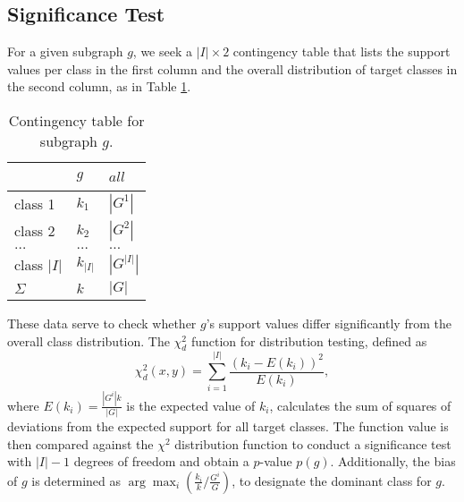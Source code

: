 \documentclass{sig-alternate}
\begin{document}
\subsection{Significance Test}
\label{ss:significance-test}
For a given subgraph $g$, we seek a $|I| \times 2$ contingency table that lists the
support values per class in the first column and the overall distribution of target
classes in the second column, as in Table \ref{t-ContingencyTableIndTest}.
\begin{table}[t]
  \centering
  \begin{tabular}{|l|l|l|}
    \hline
    ~           &	$g$       & $all$       \\\hline
    class 1	    &	$k_1$     & $|G^1|$     \\\hline
    class 2 	  &	$k_2$     & $|G^2|$     \\\hline
    $\ldots$ 	  &	$\ldots$  & $\ldots$    \\\hline
    class $|I|$	&	$k_{|I|}$ & $|G^{|I|}|$ \\\hline
    $\Sigma$	  &	$k$       & $|G|$       \\\hline
  \end{tabular}
  \caption[]{Contingency table for subgraph $g$.}
  \label{t-ContingencyTableIndTest}
\end{table}
These data serve to check whether $g$'s support values differ
significantly from the overall class distribution. The $\chi^2_d$ function for
distribution testing, defined as
\begin{equation}
  \chi^2_d(x,y) = \sum_{i=1}^{|I|} \frac{(k_i-E(k_i))^2}{E(k_i)},
  \label{eq:chid}
\end{equation} 
where $E(k_i)=\frac{|G^{i}| k}{|G|}$ is the expected value of $k_i$, calculates
the sum of squares of deviations from the expected support for all target
classes. The function value is then compared against the $\chi^2$
distribution function to conduct a significance test with
$|I|-1$ degrees of freedom and obtain a $p$-value $p(g)$. 
Additionally, the bias of $g$ is determined as $\arg\max_i (\frac{k_i}{k}/\frac{G^i}{G})$, to designate the dominant class for $g$.
\end{document}
